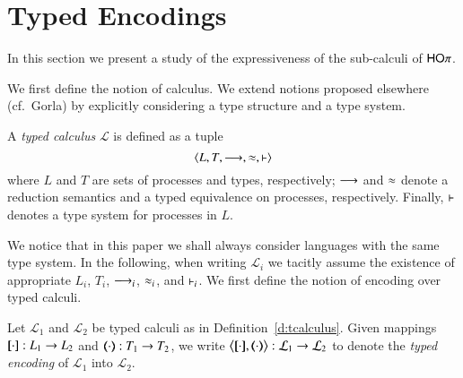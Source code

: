 \newcommand{\enc}[2]{\big\langle\map{#1}, \mapt{#2}\big\rangle}
\newcommand{\encod}[3]{\lrangle{\map{#1}^{#3}, \mapt{#2}^{#3}}}

\newcommand{\calc}[5]{\lrangle{#1, #2, #3, #4, #5}}
\newcommand{\tyl}[1]{\ensuremath{\mathcal{#1}}}

\section{Typed Encodings}

In this section we present a study of the expressiveness 
of the sub-calculi of $\mathsf{HO}\pi$.

We first define the notion of calculus.
We extend notions proposed elsewhere (cf.~Gorla) by explicitly
considering a type structure and a type system.

\begin{definition}\label{d:tcalculus}
	A \emph{typed calculus} $\tyl{L}$ is defined as a tuple $$\calc{L}{T}{\red}{\wb}{\proves}$$
	where $L$ and $T$ are sets of processes and types, respectively; %
	$\longrightarrow$ and $\approx$ denote a reduction semantics 
	and a typed equivalence
	on processes, respectively. Finally, $\vdash$ denotes a type system for processes in $L$.
\end{definition}

We notice that in this paper we shall always consider languages with the same type system.
In the following, when writing $\tyl{L}_i$ we tacitly assume the existence of appropriate 
$L_i$, $T_i$, $\longrightarrow_i$, $\approx_i$, and $\vdash_i$.
We first define the notion of encoding over typed calculi.

\begin{definition}
	Let  $\tyl{L}_1$ %
	and $\tyl{L}_2$ %
	be typed calculi as in Definition~\ref{d:tcalculus}.
	Given mappings $[\!\![\cdot]\!\!]: L_1 \to L_2$ and
	$(\!\!\langle\cdot\rangle\!\!): T_1 \to T_2$, 
	we write 
	$\enc{\cdot}{\cdot} : \tyl{L}_1 \to \tyl{L}_2$ to denote the \emph{typed encoding} of $\tyl{L}_1$ into $\tyl{L}_2$.

\end{definition}

